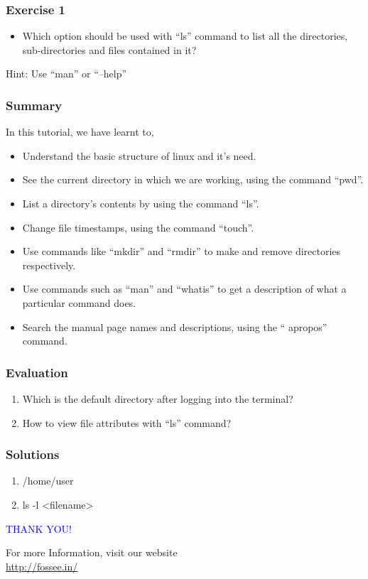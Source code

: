 \documentclass[12pt,compress]{beamer}
\begin{document}
\begin{frame}
  \frametitle{Exercise 1}
  \begin{itemize}
  \item Which option should be used with ``ls'' command to list all the directories,
        sub-directories and files contained in it? 
  \end{itemize}
        Hint: Use ``man'' or ``--help''
\end{frame}

\begin{frame}
\frametitle{Summary}
\label{sec-8}

  In this tutorial, we have learnt to,


\begin{itemize}
\item Understand the basic structure of linux and it's need.
\item See the current directory in which we are working, using the command ``pwd''.
\item List a directory's contents by using the command ``ls''.
\item Change file timestamps, using the command ``touch''.
 \item Use commands like ``mkdir'' and ``rmdir'' to make and remove directories 
      respectively.
\item Use commands such as ``man'' and ``whatis'' to get a description of 
      what a particular command does.
\item Search the manual page names and descriptions, using the `` apropos'' command.
\end{itemize}
\end{frame}
\begin{frame}[fragile]
\frametitle{Evaluation}
\label{sec-9}


\begin{enumerate}
\item Which is the default directory after logging into the terminal?
\vspace{8pt}
\item How to view file attributes with ``ls'' command? 
\end{enumerate}
\end{frame}
\begin{frame}
\frametitle{Solutions}
\label{sec-10}


\begin{enumerate}
\item /home/user
\vspace{15pt}
\item ls -l <filename>
\end{enumerate}
\end{frame}
\begin{frame}

  \begin{block}{}
  \begin{center}
  \textcolor{blue}{\Large THANK YOU!} 
  \end{center}
  \end{block}
\begin{block}{}
  \begin{center}
    For more Information, visit our website\\
    \url{http://fossee.in/}
  \end{center}  
  \end{block}
\end{frame}
\end{document}
